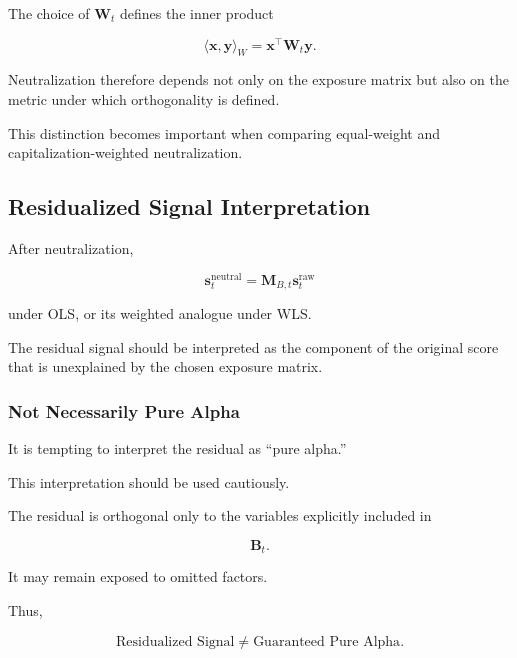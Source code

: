 \documentclass[11pt,a4paper]{article}
\begin{document}
The choice of $\mathbf{W}_t$ defines the inner product

\begin{equation}
\langle
\mathbf{x},
\mathbf{y}
\rangle_W
=
\mathbf{x}^{\top}
\mathbf{W}_t
\mathbf{y}.
\end{equation}

Neutralization therefore depends not only on the exposure matrix but also on
the metric under which orthogonality is defined.

This distinction becomes important when comparing equal-weight and
capitalization-weighted neutralization.


\subsection{Residualized Signal Interpretation}
\label{subsec:residualized_signal_interpretation}

After neutralization,

\begin{equation}
\boxed{
\mathbf{s}_t^{\mathrm{neutral}}
=
\mathbf{M}_{B,t}
\mathbf{s}_t^{\mathrm{raw}}
}
\end{equation}

under OLS, or its weighted analogue under WLS.

The residual signal should be interpreted as the component of the original
score that is unexplained by the chosen exposure matrix.


\subsubsection{Not Necessarily Pure Alpha}

It is tempting to interpret the residual as ``pure alpha.''

This interpretation should be used cautiously.

The residual is orthogonal only to the variables explicitly included in

\begin{equation}
\mathbf{B}_t.
\end{equation}

It may remain exposed to omitted factors.

Thus,

\begin{equation}
\boxed{
\text{Residualized Signal}
\neq
\text{Guaranteed Pure Alpha}.
}
\end{equation}
\end{document}
